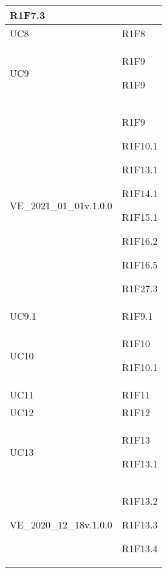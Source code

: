 \begin{center}
\begin{longtable}{|p{44mm}|p{22mm}|}
R1F7.3 \newline
\\
\hline
UC8 &

R1F8 \newline
\\
\hline
UC9 &

R1F9 \newline

R1F9 \newline
\\
\hline
VE\_2021\_01\_01v.1.0.0 &

R1F9 \newline

R1F10.1 \newline

R1F13.1 \newline

R1F14.1 \newline

R1F15.1 \newline

R1F16.2 \newline

R1F16.5 \newline

R1F27.3 \newline
\\
\hline
UC9.1 &

R1F9.1 \newline
\\
\hline
UC10 &

R1F10 \newline

R1F10.1 \newline
\\
\hline
UC11 &

R1F11 \newline
\\
\hline
UC12 &

R1F12 \newline
\\
\hline
UC13 &

R1F13 \newline

R1F13.1 \newline
\\
\hline
VE\_2020\_12\_18v.1.0.0 &

R1F13.2 \newline

R1F13.3 \newline

R1F13.4 \newline


\end{longtable}
\end{center}
